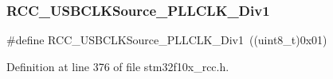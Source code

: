 \subsubsection{\texorpdfstring{R\+C\+C\+\_\+\+U\+S\+B\+C\+L\+K\+Source\+\_\+\+P\+L\+L\+C\+L\+K\+\_\+\+Div1}{RCC\_USBCLKSource\_PLLCLK\_Div1}}
{\footnotesize\ttfamily \#define R\+C\+C\+\_\+\+U\+S\+B\+C\+L\+K\+Source\+\_\+\+P\+L\+L\+C\+L\+K\+\_\+\+Div1~((uint8\+\_\+t)0x01)}



Definition at line 376 of file stm32f10x\+\_\+rcc.\+h.

